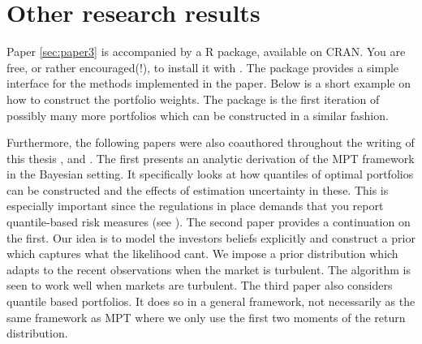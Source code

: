 \documentclass[]{book}\usepackage{knitr}
\begin{document}
\section{Other research results}

Paper \ref{sec:paper3} is accompanied by a R package, available on CRAN. 
You are free, or rather encouraged(!), to install it with \hlstd{(}\hlstd{)}. 
The package provides a simple interface for the methods implemented in the paper. 
Below is a short example on how to construct the portfolio weights. 
The package is the first iteration of possibly many more portfolios which can be constructed in a similar fashion. 
\begin{knitrout}
\color{fgcolor}
\end{knitrout}
Furthermore, the following papers were also coauthored throughout the writing of this thesis \cite{bodnar2020quantile}, \cite{bodnar2021bayesian}  and \cite{bodnar2021quantile}.
The first presents an analytic derivation of the MPT framework in the Bayesian setting. 
It specifically looks at how quantiles of optimal portfolios can be constructed and the effects of estimation uncertainty in these. 
This is especially important since the regulations in place demands that you report quantile-based risk measures (see \citet{basel4}).
The second paper provides a continuation on the first. 
Our idea is to model the investors beliefs explicitly and construct a prior which captures what the likelihood cant. 
We impose a prior distribution which adapts to the recent observations when the market is turbulent. 
The algorithm is seen to work well when markets are turbulent.
The third paper also considers quantile based portfolios. 
It does so in a general framework, not necessarily as the same framework as MPT where we only use the first two moments of the return distribution.
\end{document}
